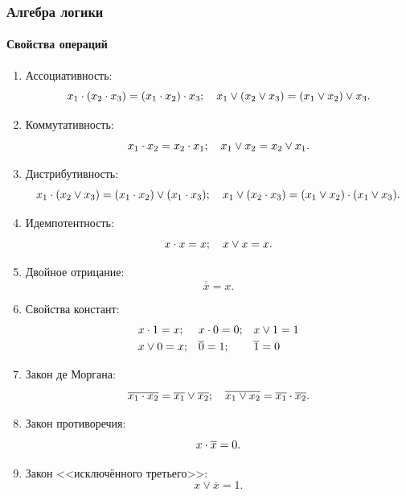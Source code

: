 \begin{frame}[allowframebreaks]
    \frametitle{Алгебра логики}
    \framesubtitle{Свойства операций}
    
    \begin{enumerate}
        \item Ассоциативность:
            \[x_1\cdot(x_2\cdot x_3) = (x_1\cdot x_2)\cdot x_3;\quad x_1\lor(x_2\lor x_3) = (x_1\lor x_2)\lor x_3.\] 
            
        \item Коммутативность:
            \[x_1\cdot x_2 = x_2\cdot x_1;\quad x_1\lor x_2 = x_2\lor x_1.\] 
         
        \item Дистрибутивность:
            \[  x_1\cdot (x_2\lor x_3) = (x_1\cdot x_2)\lor(x_1\cdot x_3);
                \quad x_1\lor (x_2\cdot x_3) = (x_1\lor x_2)\cdot(x_1\lor x_3).\] 
         
        \item Идемпотентность:
            \[x\cdot x = x;\quad x\lor x = x.\] 
            
        \item Двойное отрицание:
            \[\overline{\overline{x}} = x.\] 
            
        \item Свойства констант:
            \begin{align*}
                &x\cdot 1 = x; & &x\cdot 0 = 0;      & & x\lor 1 = 1 \\
                &x\lor 0 = x;  & &\overline{0} = 1;  & & \overline{1} = 0
            \end{align*}
            
        \item Закон де Моргана:
            \[\overline{x_1\cdot x_2} = \overline{x_1}\lor \overline{x_2};\quad \overline{x_1\lor x_2} = \overline{x_1}\cdot \overline{x_2}.\] 
            
        \item Закон противоречия:
            \[x\cdot \overline{x} = 0.\] 
            
        \item Закон <<исключённого третьего>>:
            \[x\lor \overline{x} = 1.\] 
    \end{enumerate}
\end{frame}

